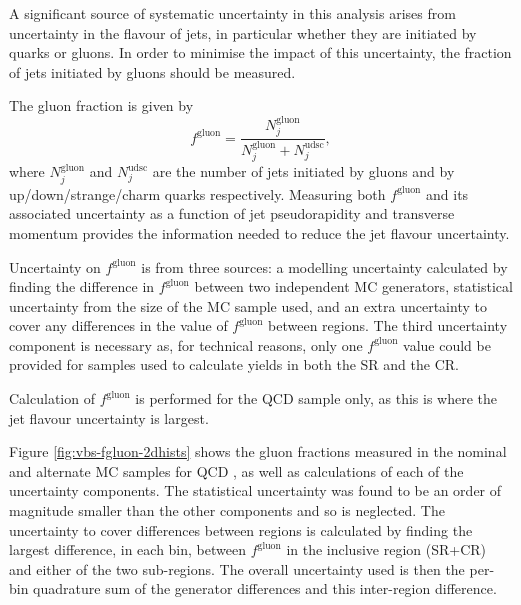 \newcommand\fgluon{$f^\text{gluon}$\xspace}

A significant source of systematic uncertainty in this analysis arises from
uncertainty in the flavour of jets, in particular whether they are initiated by
quarks or gluons. In order to minimise the impact of this uncertainty, the
fraction of jets initiated by gluons should be measured.

The gluon fraction is given by
%
\begin{equation*}
  f^\text{gluon} = \frac{ N_j^\text{gluon} }
                        { N_j^\text{gluon} + N_j^\text{udsc}},
\end{equation*}
%
where $N_j^\mathrm{gluon}$ and $N_j^\mathrm{udsc}$ are the number of
jets initiated by gluons and by up/down/strange/charm quarks respectively.
Measuring both \fgluon and its associated uncertainty as a function of jet
pseudorapidity and transverse momentum provides the information needed to reduce
the jet flavour uncertainty.

Uncertainty on \fgluon is from three sources: a modelling uncertainty calculated
by finding the difference in \fgluon between two independent \ac{MC} generators,
statistical uncertainty from the size of the \ac{MC} sample used, and an extra
uncertainty to cover any differences in the value of \fgluon between regions.
The third uncertainty component is necessary as, for technical reasons, only one
\fgluon value could be provided for samples used to calculate yields in both
the \ac{SR} and the \ac{CR}.

Calculation of \fgluon is performed for the \ac{QCD} \Zy sample only, as this is
where the jet flavour uncertainty is largest.

Figure \ref{fig:vbs-fgluon-2dhists} shows the gluon fractions measured in the
nominal and alternate \ac{MC} samples for \ac{QCD} \Zy, as well as calculations
of each of the uncertainty components.  The statistical uncertainty was found to
be an order of magnitude smaller than the other components and so is neglected.
The uncertainty to cover differences between regions is calculated by finding
the largest difference, in each bin, between \fgluon in the inclusive region
(\ac{SR}+\ac{CR}) and either of the two sub-regions. The overall uncertainty
used is then the per-bin quadrature sum of the generator differences and this
inter-region difference.


